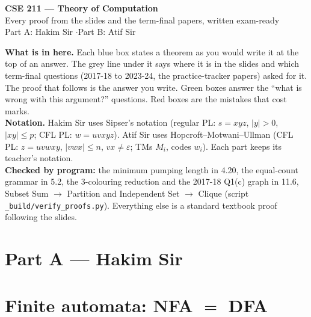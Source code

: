\documentclass[10.5pt,a4paper]{article}
\newcommand{\eps}{\varepsilon}
\begin{document}
\begin{center}
{\Large\bfseries\color{navy} CSE 211 --- Theory of Computation}\\[2pt]
{\large Every proof from the slides and the term-final papers, written exam-ready}\\[2pt]
{\small Part A: Hakim Sir \quad$\cdot$\quad Part B: Atif Sir}
\end{center}

\begin{tcolorbox}[colback=white,colframe=navy,boxrule=0.4pt,arc=1pt,left=6pt,right=6pt,top=3pt,bottom=3pt]
\textbf{What is in here.} Each blue box states a theorem as you would write it at the top of an answer. The grey line under it says where
it is in the slides and which term-final questions (2017-18 to 2023-24, the practice-tracker papers) asked for it. The proof that follows is
the answer you write. Green boxes answer the ``what is wrong with this argument?'' questions. Red boxes are the mistakes that cost marks.\\[2pt]
\textbf{Notation.} Hakim Sir uses Sipser's notation (regular PL: $s=xyz$, $|y|>0$, $|xy|\le p$; CFL PL: $w=uvxyz$).
Atif Sir uses Hopcroft--Motwani--Ullman (CFL PL: $z=uvwxy$, $|vwx|\le n$, $vx\ne\eps$; TMs $M_i$, codes $w_i$).
Each part keeps its teacher's notation.\\[2pt]
\textbf{Checked by program:} the minimum pumping length in 4.20, the equal-count grammar in 5.2, the 3-colouring reduction and the 2017-18
Q1(c) graph in 11.6, Subset Sum $\to$ Partition and Independent Set $\to$ Clique (script \texttt{\_build/verify\_proofs.py}).
Everything else is a standard textbook proof following the slides.
\end{tcolorbox}

\tableofcontents

\clearpage
\section*{Part A --- Hakim Sir}

\section{Finite automata: NFA $=$ DFA}
\end{document}
